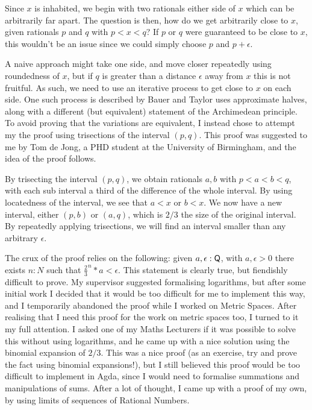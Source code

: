 \documentclass[ProjectReport]{subfiles}
\begin{document}
Since $x$ is inhabited, we begin with two rationals either side of $x$ which can be arbitrarily far apart. The question is then, how do we get arbitrarily close to $x$, given rationals $p$ and $q$ with $p < x < q$? If $p$ or $q$ were guaranteed to be close to $x$, this wouldn't be an issue since we could simply choose $p$ and $p + \epsilon$.

A naive approach might take one side, and move closer repeatedly using roundedness of $x$, but if $q$ is greater than a distance $\epsilon$ away from $x$ this is not fruitful. As such, we need to use an iterative process to get close to $x$ on each side. One such process is described by Bauer and Taylor \cite[Proposition 11.15]{bauer_taylor_2009} uses approximate halves, along with a different (but equivalent) statement of the Archimedean principle. To avoid proving that the variations are equivalent, I instead chose to attempt my the proof using trisections of the interval $(p,q)$. This proof was suggested to me by Tom de Jong, a PHD student at the University of Birmingham, and the idea of the proof follows.

By trisecting the interval $(p,q)$, we obtain rationals $a,b$ with $p<a<b<q$, with each sub interval a third of the difference of the whole interval. By using locatedness of the interval, we see that $a < x$ or $b < x$. We now have a new interval, either $(p,b)$ or $(a,q)$, which is $2/3$ the size of the original interval. By repeatedly applying trisections, we will find an interval smaller than any arbitrary $\epsilon$. 

The crux of the proof relies on the following: given $a,\epsilon : \AgdaFunction{Q}$, with $a , \epsilon > 0$ there exists $n : N$ such that $\frac{2}{3}^n * a < \epsilon$. This statement is clearly true, but fiendishly difficult to prove. My supervisor suggested formalising logarithms, but after some initial work I decided that it would be too difficult for me to implement this way, and I temporarily abandoned the proof while I worked on Metric Spaces. After realising that I need this proof for the work on metric spaces too, I turned to it my full attention. I asked one of my Maths Lecturers if it was possible to solve this without using logarithms, and he came up with a nice solution using the binomial expansion of $2/3$. This was a nice proof (as an exercise, try and prove the fact using binomial expansions!), but I still believed this proof would be too difficult to implement in Agda, since I would need to formalise summations and manipulations of sums. After a lot of thought, I came up with a proof of my own, by using limits of sequences of Rational Numbers.
\end{document}
